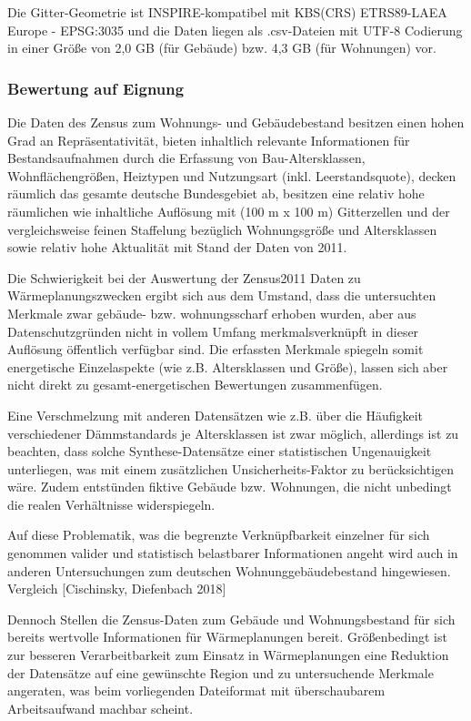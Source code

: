 				Die Gitter-Geometrie ist INSPIRE-kompatibel mit KBS(CRS) ETRS89-LAEA Europe - EPSG:3035 und die Daten liegen als .csv-Dateien mit UTF-8 Codierung in einer Größe von 2,0 GB (für Gebäude) bzw. 4,3 GB (für Wohnungen) vor. 
	
			\subsubsection{Bewertung auf Eignung}
				
				Die Daten des Zensus zum Wohnungs- und Gebäudebestand besitzen einen hohen Grad an Repräsentativität, bieten inhaltlich relevante Informationen für Bestandsaufnahmen durch die Erfassung von Bau-Altersklassen, Wohnflächengrößen, Heiztypen und Nutzungsart (inkl. Leerstandsquote), decken räumlich das gesamte deutsche Bundesgebiet ab, besitzen eine relativ hohe räumlichen wie inhaltliche Auflösung mit (100 m x 100 m) Gitterzellen und der vergleichsweise feinen Staffelung bezüglich Wohnungsgröße und Altersklassen sowie relativ hohe Aktualität mit Stand der Daten von 2011. 
				
				Die Schwierigkeit bei der Auswertung der Zensus2011 Daten zu Wärmeplanungszwecken ergibt sich aus dem Umstand, dass die untersuchten Merkmale zwar gebäude- bzw. wohnungsscharf erhoben wurden, aber aus Datenschutzgründen nicht in vollem Umfang merkmalsverknüpft in dieser Auflösung öffentlich verfügbar sind. Die erfassten Merkmale spiegeln somit energetische Einzelaspekte (wie z.B. Altersklassen und Größe), lassen sich aber nicht direkt zu gesamt-energetischen Bewertungen zusammenfügen.
				
				Eine Verschmelzung mit anderen Datensätzen wie z.B. über die Häufigkeit verschiedener Dämmstandards je Altersklassen ist zwar möglich, allerdings ist zu beachten, dass solche Synthese-Datensätze einer statistischen Ungenauigkeit unterliegen, was mit einem zusätzlichen Unsicherheits-Faktor zu berücksichtigen wäre. Zudem entstünden fiktive Gebäude bzw. Wohnungen, die nicht unbedingt die realen Verhältnisse widerspiegeln. 
				
				Auf diese Problematik, was die begrenzte Verknüpfbarkeit einzelner für sich genommen valider und statistisch belastbarer Informationen angeht wird auch in anderen Untersuchungen zum deutschen Wohnunggebäudebestand hingewiesen. Vergleich [Cischinsky, Diefenbach 2018]
				
				Dennoch Stellen die Zensus-Daten zum Gebäude und Wohnungsbestand für sich bereits wertvolle Informationen für Wärmeplanungen bereit. Größenbedingt ist zur besseren Verarbeitbarkeit zum Einsatz in Wärmeplanungen eine Reduktion der Datensätze auf eine gewünschte Region und zu untersuchende Merkmale angeraten, was beim vorliegenden Dateiformat mit überschaubarem Arbeitsaufwand machbar scheint.
		
